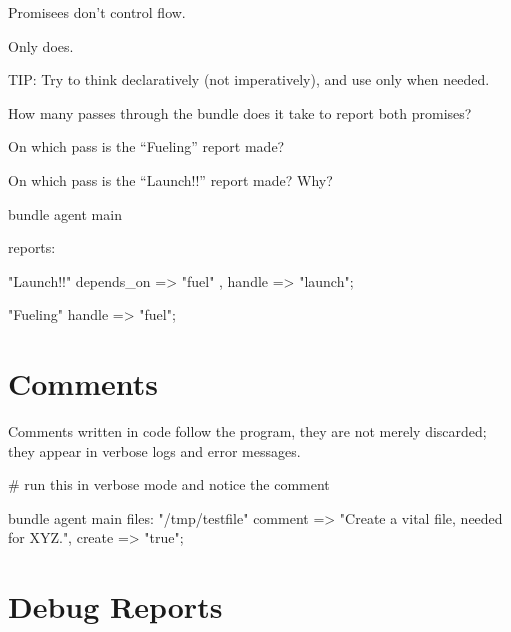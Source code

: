 Promisees don't control flow.

Only  does.

TIP: Try to think declaratively (not imperatively), and use 
only when needed.





\begin{aside}
\label{aside:exercise_23}

How many passes through the bundle does it take to report both promises?

On which pass is the ``Fueling'' report made?

On which pass is the ``Launch!!'' report made? Why?

\begin{code}
bundle agent main
{
  reports:

      "Launch!!"
        depends_on => { "fuel" },
        handle => "launch";

      "Fueling"
        handle => "fuel";
}
\end{code}

\end{aside}





\section{Comments}

Comments written in code follow the program, they are not merely
discarded; they appear in verbose logs and error messages.

\begin{codelisting}
\begin{code}
# run this in verbose mode and notice the comment

bundle agent main
{
  files:
      "/tmp/testfile"
        comment => "Create a vital file, needed for XYZ.",
        create  => "true";
}
\end{code}
\end{codelisting}





\section{Debug Reports}

